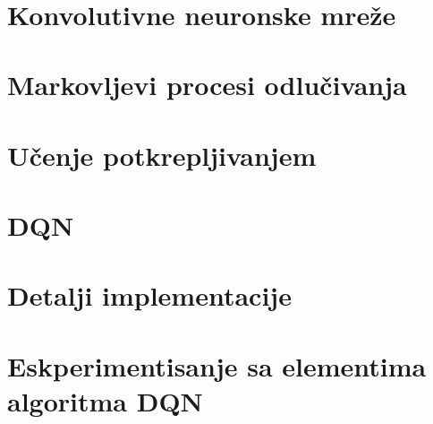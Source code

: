\documentclass[12pt]{report}
\begin{document}
\newpage ~ \thispagestyle{empty}

\tableofcontents{}

\newpage
{}




\chapter{Konvolutivne neuronske mreže}
\label{ch:cnn}
\chapter{Markovljevi procesi odlučivanja}
\label{ch:mdp}

\chapter{Učenje potkrepljivanjem}
\label{ch:rl}

\chapter{DQN}
\label{ch:dqn}

\chapter{Detalji implementacije}
\label{ch:implementacija}

\chapter{Eskperimentisanje sa elementima algoritma DQN}
\label{ch:eksperimenti}
\end{document}
